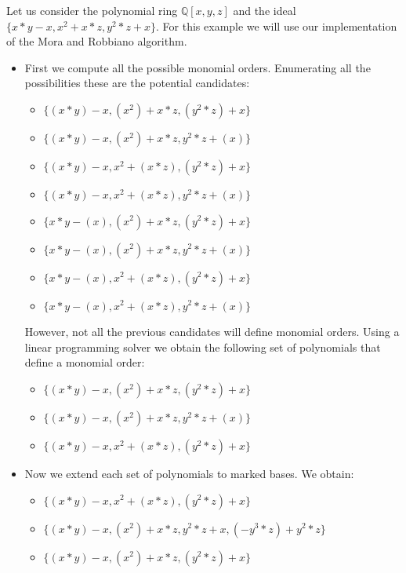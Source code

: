 \begin{example}
  Let us consider the polynomial ring $\mathbb{Q}[x, y, z]$ and
  the ideal $\{x*y - x, x^2 + x*z, y^2*z + x\}$. For this example we will
  use our implementation of the Mora and Robbiano algorithm.

  \begin{itemize}
  \item First we compute all the possible monomial orders. Enumerating all the possibilities
    these are the potential candidates:

    \begin{itemize}
    \item $\{(x*y) - x, (x^2) + x*z, (y^2*z) + x\}$
    \item $\{(x*y) - x, (x^2) + x*z, y^2*z + (x)\}$
    \item $\{(x*y) - x, x^2 + (x*z), (y^2*z) + x\}$
    \item $\{(x*y) - x, x^2 + (x*z), y^2*z + (x)\}$
    \item $\{x*y - (x), (x^2) + x*z, (y^2*z) + x\}$
    \item $\{x*y - (x), (x^2) + x*z, y^2*z + (x)\}$
    \item $\{x*y - (x), x^2 + (x*z), (y^2*z) + x\}$
    \item $\{x*y - (x), x^2 + (x*z), y^2*z + (x)\}$
    \end{itemize}

    However, not all the previous candidates will define monomial orders. Using a linear
    programming solver we obtain the following set of polynomials that define
    a monomial order:
    
    \begin{itemize}
    \item $\{(x*y) - x, (x^2) + x*z, (y^2*z) + x\}$
    \item $\{(x*y) - x, (x^2) + x*z, y^2*z + (x)\}$
    \item $\{(x*y) - x, x^2 + (x*z), (y^2*z) + x\}$
    \end{itemize}

  \item Now we extend each set of polynomials to marked \grob bases.
    We obtain:

    \begin{itemize}
    \item $\{(x*y) - x, x^2 + (x*z), (y^2*z) + x\}$
    \item $\{(x*y) - x, (x^2) + x*z, y^2*z + x, (-y^3*z) + y^2*z\}$
    \item $\{(x*y) - x, (x^2) + x*z, (y^2*z) + x\}$
    \end{itemize}


\end{itemize}
\end{example}
